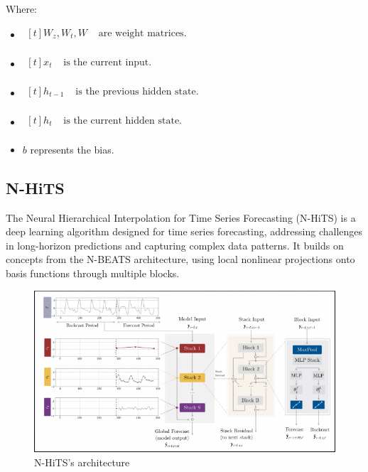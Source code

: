 \documentclass{ieeeojies}
\begin{document}
Where: 
\begin{itemize}
    \item $\begin{aligned}[t]
            W_z, W_t, W & \text{ are weight matrices.} \\
            \end{aligned}$
    \item $\begin{aligned}[t]
            x_t & \text{ is the current input.} \\
            \end{aligned}$
    \item $\begin{aligned}[t]
            h_{t-1} & \text{ is the previous hidden state.} \\
            \end{aligned}$
   \item $\begin{aligned}[t]
            h_t & \text{ is the current hidden state.} \\
            \end{aligned}$     
    \item $b$ represents the bias.
\end{itemize}

\subsection{N-HiTS}
The Neural Hierarchical Interpolation for Time Series Forecasting (N-HiTS) is a deep learning algorithm designed for time series forecasting, addressing challenges in long-horizon predictions and capturing complex data patterns. It builds on concepts from the N-BEATS architecture, using local nonlinear projections onto basis functions through multiple blocks.

\begin{figure}[H]
    \centering
    \begin{minipage}{0.50\textwidth}
    \centering
    \includegraphics[width=1\textwidth]{N-HiTS.png}
    \caption{N-HiTS’s architecture}
    \label{fig:1}
    \end{minipage}
\end{figure}
\end{document}
